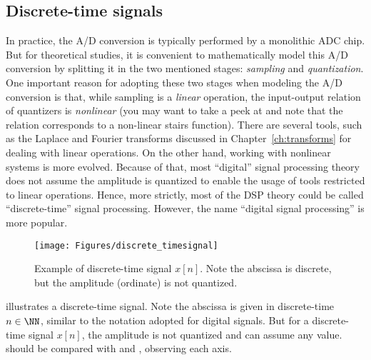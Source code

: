 
\subsection{Discrete-time signals}

In practice, the A/D conversion is typically performed by a monolithic ADC chip. But for theoretical studies, it is convenient to mathematically model this A/D conversion by splitting it in the two mentioned stages: \emph{sampling} and \emph{quantization}.
One important reason for adopting these two stages when modeling the A/D conversion is that, while sampling is a \emph{linear} operation, the input-output relation of quantizers is \emph{nonlinear} (you may want to take a peek at  and note that the relation corresponds to a non-linear stairs function).  There are several tools, such as the Laplace and Fourier transforms discussed in Chapter~\ref{ch:transforms} for dealing with linear operations. On the other hand, working with nonlinear systems is more evolved. Because of that, most ``digital'' signal processing theory does not assume the amplitude is quantized to enable the usage of tools restricted to linear operations. Hence, more strictly, most of the DSP theory could be called ``discrete-time'' signal processing. However, the name ``digital signal processing'' is more popular. 

\begin{figure}
	\centering
		\texttt{[image: Figures/discrete\_timesignal]}		
	\caption[Example of discrete-time signal]{Example of discrete-time signal $x[n]$. Note the abscissa is discrete, but the amplitude (ordinate) is not quantized.\label{fig:discrete_timesignal}}
\end{figure}

 illustrates a discrete-time signal. Note the abscissa is given in discrete-time $n \in \NN$, similar to the notation adopted for digital signals. But for a discrete-time signal $x[n]$, the amplitude is not quantized and can assume any value.
 should be compared with  and , observing each axis.

